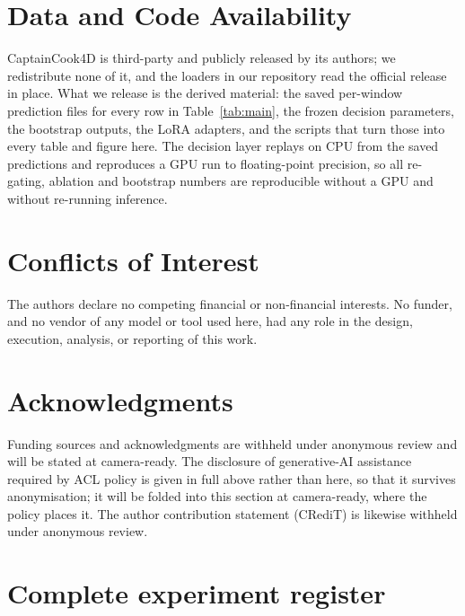 \documentclass[10pt,twocolumn]{article}
\newcommand{\fundingnote}{Funding sources and acknowledgments are withheld
under anonymous review and will be stated at camera-ready.}
\begin{document}
\section*{Data and Code Availability}
CaptainCook4D \citep{peddi2024captaincook4d} is third-party and publicly
released by its authors; we redistribute none of it, and the loaders in our
repository read the official release in place. What we release is the
derived material: the saved per-window prediction files for every row in
Table~\ref{tab:main}, the frozen decision parameters, the bootstrap outputs, the
LoRA adapters, and the scripts that turn those into every table and figure here.
The decision layer replays on CPU from the saved predictions and reproduces a
GPU run to floating-point precision, so all re-gating, ablation and bootstrap
numbers are reproducible without a GPU and without re-running inference.

\section*{Conflicts of Interest}
The authors declare no competing financial or non-financial interests. No
funder, and no vendor of any model or tool used here, had any role in the
design, execution, analysis, or reporting of this work.

\section*{Acknowledgments}
\fundingnote{} The disclosure of generative-AI assistance required by ACL policy
is given in full above rather than here, so that it survives anonymisation; it
will be folded into this section at camera-ready, where the policy places it.
The author contribution statement (CRediT) is likewise withheld under anonymous
review.




\appendix

\section{Complete experiment register}
\label{app:register}
\end{document}
